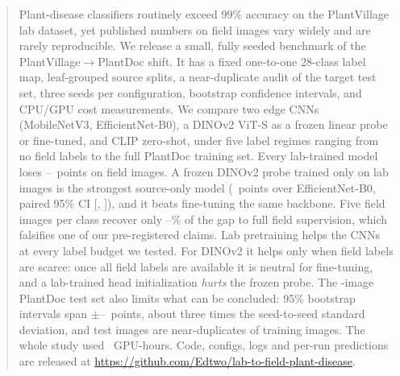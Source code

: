 \begin{abstract}
Plant-disease classifiers routinely exceed 99\% accuracy on the PlantVillage lab dataset, yet published numbers on field images vary widely and are rarely reproducible.
We release a small, fully seeded benchmark of the PlantVillage$\rightarrow$PlantDoc shift. It has a fixed one-to-one 28-class label map, leaf-grouped source splits, a near-duplicate audit of the target test set, three seeds per configuration, bootstrap confidence intervals, and CPU/GPU cost measurements.
We compare two edge CNNs (MobileNetV3, EfficientNet-B0), a DINOv2 ViT-S as a frozen linear probe or fine-tuned, and CLIP zero-shot, under five label regimes ranging from no field labels to the full PlantDoc training set.
Every lab-trained model loses \dinovtwoslpGap--\mnvthreeGap\ points on field images.
A frozen DINOv2 probe trained only on lab images is the strongest source-only model (\PCa\ points over EfficientNet-B0, paired 95\% CI [\PCalo, \PCahi]), and it beats fine-tuning the same backbone.
Five field images per class recover only \effbzeroRec--\dinovtwoslpRec\% of the gap to full field supervision, which falsifies one of our pre-registered claims.
Lab pretraining helps the CNNs at every label budget we tested. For DINOv2 it helps only when field labels are scarce: once all field labels are available it is neutral for fine-tuning, and a lab-trained head initialization \emph{hurts} the frozen probe.
The \PDtestN-image PlantDoc test set also limits what can be concluded: 95\% bootstrap intervals span $\pm$\CIhwMin--\CIhwMax\ points, about three times the seed-to-seed standard deviation, and \PDdups test images are near-duplicates of training images.
The whole study used \GPUHours\ GPU-hours. Code, configs, logs and per-run predictions are released at \url{https://github.com/Edtwo/lab-to-field-plant-disease}.
\end{abstract}
